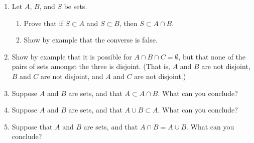 \begin{enumerate}
    \item Let $A$, $B$, and $S$ be sets.
  \begin{enumerate}
      \item Prove that if $S \subset A$ and $S \subset B$, then $S \subset A \cap B$.
      \item Show by example that the converse is false.
  \end{enumerate}

    \item Show by example that it is possible for $A \cap B \cap C = \emptyset$, but that none of the pairs of sets amongst the three is disjoint. (That is, $A$ and $B$ are not disjoint, $B$ and $C$ are not disjoint, and $A$ and $C$ are not disjoint.)

    \item Suppose $A$ and $B$ are sets, and that $A \subset A \cap B$. What can you conclude?

    \item Suppose $A$ and $B$ are sets, and that $A \cup B \subset A$. What can you conclude?

    \item Suppose that $A$ and $B$ are sets, and that $A \cap B = A \cup B$. What can you conclude?

\end{enumerate}
